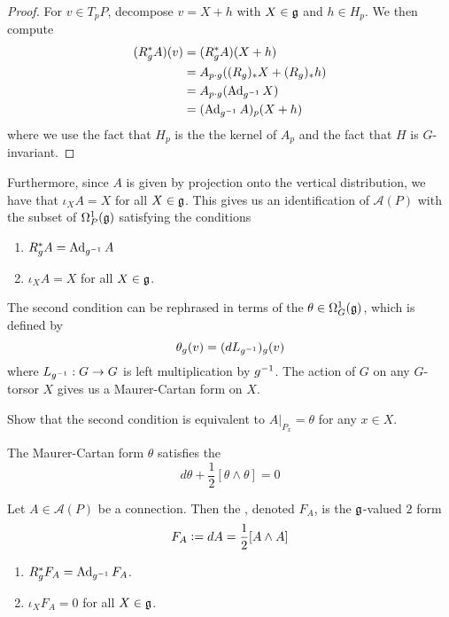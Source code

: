%
\begin{proof}
For $v \in T_pP$, decompose $v = X + h$ with $X \in \mathfrak{g}$ and $h \in H_p$.
We then compute
\begin{align*}
(R_g^*A)(v) &= (R^*_gA)(X + h) \\
&= A_{p\cdot g}((R_g)_*X + (R_g)_*h) \\
&= A_{p\cdot g}(\operatorname{Ad}_{g^{-1}} X) \\
&= (\operatorname{Ad}_{g^{-1}}A)_p(X+h)
\end{align*}
where we use the fact that $H_p$ is the the kernel of $A_p$ and the fact that $H$
is $G$-invariant.
\end{proof}
%
Furthermore, since $A$ is given by projection onto the vertical distribution,
we have that $\iota_XA = X$ for all $X \in \mathfrak{g}$. This gives us an identification
of $\mathscr{A}(P)$ with the subset of $\Omega^1_P(\mathfrak{g})$ satisfying the conditions
\begin{enumerate}
  \item $R_g^*A = \operatorname{Ad}_{g^{-1}}A$
  \item $\iota_XA = X$ for all $X \in \mathfrak{g}$.
\end{enumerate}
%
The second condition can be rephrased in terms of the 
$\theta \in \Omega^1_G(\mathfrak{g})$, which is defined by
\[
\theta_g(v) = (dL_{g^{-1}})_g(v)
\]
where $L_{g^{-1}} : G \to G$ is left multiplication by $g^{-1}$. The action
of $G$ on any $G$-torsor $X$ gives us a Maurer-Cartan form on $X$.
%
\begin{exer}
Show that the second condition is equivalent to $A\vert_{P_x} = \theta$
for any $x \in X$.
\end{exer}
%
The Maurer-Cartan form $\theta$ satisfies the 
\[
d\theta + \frac{1}{2}[\theta\wedge\theta] = 0
\]
%
\begin{defn}
Let $A \in \mathscr{A}(P)$ be a connection. Then the ,
denoted $F_A$, is the $\mathfrak{g}$-valued $2$ form
\[
F_A \vcentcolon= dA = \frac{1}{2}[A \wedge A]
\]
\end{defn}
%
\begin{prop} \enumbreak
\begin{enumerate}
  \item $R^*_gF_A = \operatorname{Ad}_{g^{-1}}F_A$.
  \item $\iota_XF_A = 0$ for all $X \in \mathfrak{g}$.
\end{enumerate}
\end{prop}
%
